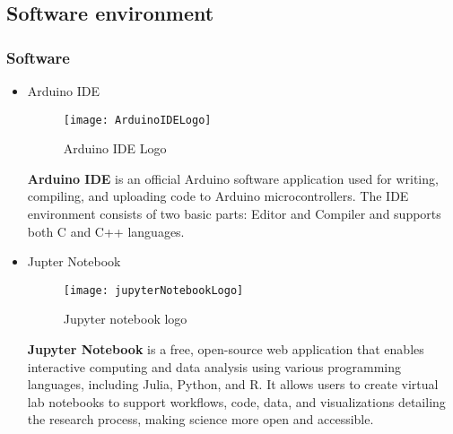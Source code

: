 \subsection{Software environment }
\subsubsection{Software}
\begin{itemize}
  \item Arduino IDE
\FloatBarrier
\begin{figure}[h]
         \centering
        \texttt{[image: ArduinoIDELogo]}
   
        \caption{Arduino IDE Logo}
        \label{fig:ArduinoIDELogo}
    \end{figure}
\FloatBarrier
\subitem\textbf{Arduino IDE} is an official Arduino software application used for writing, compiling, and uploading code to Arduino microcontrollers. The IDE environment consists of two basic parts: Editor and Compiler and supports both C and C++ languages.\cite{MA18}

   
  \item Jupter Notebook
\begin{figure}[h]
         \centering
        \texttt{[image: jupyterNotebookLogo]}
   
        \caption{Jupyter notebook logo}
        \label{fig:Jupyter notebook logo}
    \end{figure}
\FloatBarrier
\subitem\textbf{Jupyter Notebook} is a free, open-source web application that enables interactive computing and data analysis using various programming languages, including Julia, Python, and R.\cite{BMIPC17}
\subitem It allows users to create virtual lab notebooks to support workflows, code, data, and visualizations detailing the research process, making science more open and accessible.\cite{BMIPC17}
\end{itemize}
